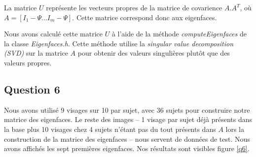 \documentclass[a4paper]{article}
\begin{document}
La matrice $U$ représente les vecteurs propres de la matrice de covarience $A.A^T$, où 
$A = [I_1 - \Psi ... I_m - \Psi]$.
Cette matrice correspond donc aux eigenfaces.

Nous avons calculé cette matrice $U$ à l'aide de la méthode {\em computeEigenfaces} de la classe {\em
Eigenfaces.h}. Cette méthode utilise la {\em singular value decomposition (SVD)} sur la matrice $A$ pour
obtenir des valeurs singulières plutôt que des valeurs propres.

\subsection{Question 6}

Nous avons utilisé 9 visages sur 10 par sujet, avec 36 sujets pour construire notre matrice des eigenfaces.
Le reste des images -- 1 visage par sujet déjà présents dans la base plus 10 visages chez 4 sujets n'étant pas du tout
présents dans $A$ lors la construction de la matrice des eigenfaces -- nous servent de données de test.
Nous avons affichés les sept premières eigenfaces. Nos résultats sont visibles figure \ref{q6}.
\end{document}
